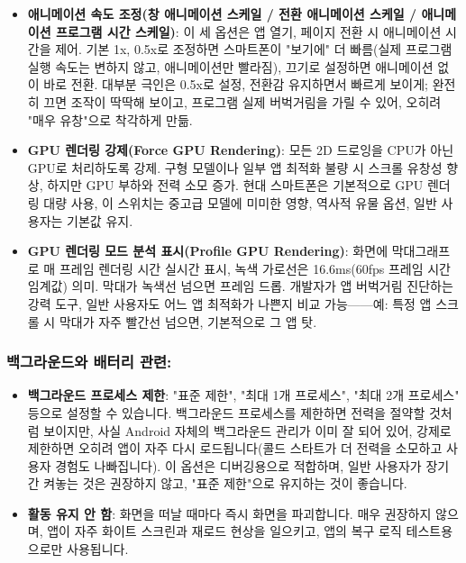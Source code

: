\begin{itemize}
  \item \textbf{애니메이션 속도 조정(창 애니메이션 스케일 / 전환 애니메이션 스케일 / 애니메이션 프로그램 시간 스케일)}: 이 세 옵션은 앱 열기, 페이지 전환 시 애니메이션 시간을 제어. 기본 1x, 0.5x로 조정하면 스마트폰이 "보기에" 더 빠름(실제 프로그램 실행 속도는 변하지 않고, 애니메이션만 빨라짐), 끄기로 설정하면 애니메이션 없이 바로 전환. 대부분 극인은 0.5x로 설정, 전환감 유지하면서 빠르게 보이게; 완전히 끄면 조작이 딱딱해 보이고, 프로그램 실제 버벅거림을 가릴 수 있어, 오히려 "매우 유창"으로 착각하게 만듦.
  \item \textbf{GPU 렌더링 강제(Force GPU Rendering)}: 모든 2D 드로잉을 CPU가 아닌 GPU로 처리하도록 강제. 구형 모델이나 일부 앱 최적화 불량 시 스크롤 유창성 향상, 하지만 GPU 부하와 전력 소모 증가. 현대 스마트폰은 기본적으로 GPU 렌더링 대량 사용, 이 스위치는 중고급 모델에 미미한 영향, 역사적 유물 옵션, 일반 사용자는 기본값 유지.
  \item \textbf{GPU 렌더링 모드 분석 표시(Profile GPU Rendering)}: 화면에 막대그래프로 매 프레임 렌더링 시간 실시간 표시, 녹색 가로선은 16.6ms(60fps 프레임 시간 임계값) 의미. 막대가 녹색선 넘으면 프레임 드롭. 개발자가 앱 버벅거림 진단하는 강력 도구, 일반 사용자도 어느 앱 최적화가 나쁜지 비교 가능——예: 특정 앱 스크롤 시 막대가 자주 빨간선 넘으면, 기본적으로 그 앱 탓.
\end{itemize}

\subsubsection*{백그라운드와 배터리 관련:}

\begin{itemize}
  \item \textbf{백그라운드 프로세스 제한}: "표준 제한", "최대 1개 프로세스", "최대 2개 프로세스" 등으로 설정할 수 있습니다. 백그라운드 프로세스를 제한하면 전력을 절약할 것처럼 보이지만, 사실 Android 자체의 백그라운드 관리가 이미 잘 되어 있어, 강제로 제한하면 오히려 앱이 자주 다시 로드됩니다(콜드 스타트가 더 전력을 소모하고 사용자 경험도 나빠집니다). 이 옵션은 디버깅용으로 적합하며, 일반 사용자가 장기간 켜놓는 것은 권장하지 않고, "표준 제한"으로 유지하는 것이 좋습니다.
  \item \textbf{활동 유지 안 함}: 화면을 떠날 때마다 즉시 화면을 파괴합니다. 매우 권장하지 않으며, 앱이 자주 화이트 스크린과 재로드 현상을 일으키고, 앱의 복구 로직 테스트용으로만 사용됩니다.
\end{itemize}

